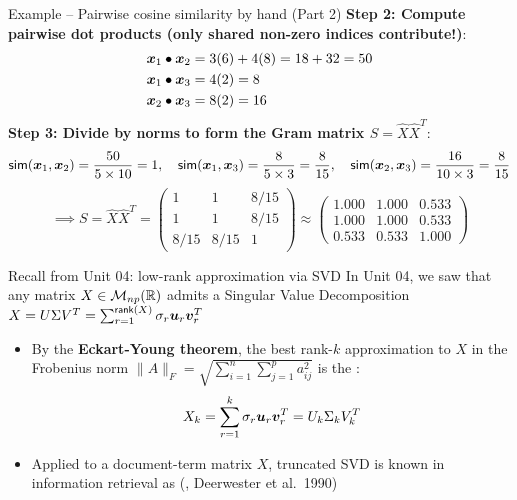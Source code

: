 \documentclass[aspectratio=169]{beamer}\usepackage[]{graphicx}\usepackage[]{xcolor}
\begin{document}
\begin{frame}{Example -- Pairwise cosine similarity by hand (Part 2)}
\textbf{Step 2: Compute pairwise dot products (only shared non-zero indices contribute!)}:
\begin{align*}
\bm{x}_1 \bullet \bm{x}_2 &= 3(6) + 4(8) = 18 + 32 = 50 \\
\bm{x}_1 \bullet \bm{x}_3 &= 4(2) = 8 \\
\bm{x}_2 \bullet \bm{x}_3 &= 8(2) = 16
\end{align*}
\vfill
\textbf{Step 3: Divide by norms to form the Gram matrix $S = \hat{X} \hat{X}^T$}:
\[
\mathsf{sim}(\bm{x}_1, \bm{x}_2) = \frac{50}{5 \times 10} = 1, \quad
\mathsf{sim}(\bm{x}_1, \bm{x}_3) = \frac{8}{5 \times 3} = \frac{8}{15}, \quad
\mathsf{sim}(\bm{x}_2, \bm{x}_3) = \frac{16}{10 \times 3} = \frac{8}{15}
\]
\[
\implies S = \hat{X} \hat{X}^T =
\begin{pmatrix}
1 & 1 & 8/15 \\
1 & 1 & 8/15 \\
8/15 & 8/15 & 1
\end{pmatrix}
\approx
\begin{pmatrix}
1.000 & 1.000 & 0.533 \\
1.000 & 1.000 & 0.533 \\
0.533 & 0.533 & 1.000
\end{pmatrix}
\]
\end{frame}




\begin{frame}{Recall from Unit 04: low-rank approximation via SVD}
In Unit 04, we saw that any matrix $X \in \mathcal{M}_{np}(\mathbb{R})$ admits a Singular Value Decomposition $X = U \Sigma V^T = \sum_{r=1}^{\mathsf{rank}(X)} \sigma_r \bm{u}_r \bm{v}_r^T$
\vfill
\begin{itemize}
\item By the \textbf{Eckart-Young theorem}, the best rank-$k$ approximation to $X$ in the Frobenius norm $\|A\|_F = \sqrt{\sum_{i=1}^n \sum_{j=1}^p a_{ij}^2}$ is the :
\[
X_k = \sum_{r=1}^k \sigma_r \bm{u}_r \bm{v}_r^T = U_k \Sigma_k V_k^T
\]
\vfill
\item Applied to a document-term matrix $X$, truncated SVD is known in information retrieval as  (, Deerwester et al.\ 1990)
\end{itemize}
\end{frame}
\end{document}
